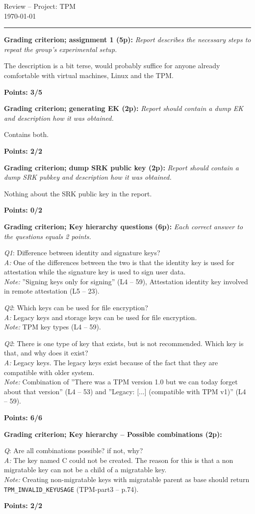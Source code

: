 \documentclass{article}
\newcommand{\grade}[5]{
  \textbf{Grading criterion; #1 (#3p):}\textit{#4}

  #5
  \hfill
  \begin{varwidth}{\linewidth}
    \textbf{Points: #2/#3}
  \end{varwidth}
}
\newcommand{\QAN}[5]{
  \textit{Q#1}:#3  \\
  \ifthenelse{\equal{#2}{C}}{
    \def \grading {\Large\textcolor{green}{\checkmark}\normalsize}
  }{
    \def \grading {\Large\textcolor{red}{\textbf{x}\hspace{0.142cm}}\normalsize}
  }
  \textit{A:}#4\hfill\grading \\
  \textit{Note:}#5
}
\begin{document}
  \begin{center}
    \huge{Review -- Project: TPM} \\
    \vspace{0.2cm}
    \Large{\today}
    \vspace{0.4cm}
    \hrule
  \end{center}

  \grade{assignment 1}{3}{5}
  {
    Report describes the necessary steps to repeat the group's
    experimental setup.
  }
  {
    The description is a bit terse, would probably suffice for anyone already
    comfortable with virtual machines, Linux and the TPM.
  }

  \grade{generating EK}{2}{2}
  {
    Report should contain a dump EK and description how it was obtained.
  }
  {
    Contains both.
  }

  \grade{dump SRK public key}{0}{2}
  {
    Report should contain a dump SRK pubkey and description how it was
    obtained.
  }
  {
    Nothing about the SRK public key in the report.
  }

  \grade{Key hierarchy questions}{6}{6}
  {
    Each correct answer to the questions equals 2 points.
  }
  {
    \QAN{1}{C}{
      Difference between identity and signature keys?
    }
    {
      One of the differences between the two is that the identity key is used
      for attestation while the signature key is used to sign user data.
    }
    {
      ''Signing keys only for signing'' (L4 -- 59), Attestation identity
      key involved in remote attestation (L5 -- 23).
    }

    \QAN{2}{C}{
      Which keys can be used for file encryption?
    }
    {
      Legacy keys and storage keys can be used for file encryption.
    }
    {
      TPM key types (L4 -- 59).
    }

    \QAN{2}{C}{
      There is one type of key that exists, but is not recommended. Which key
      is that, and why does it exist?
    }
    {
      Legacy keys. The legacy keys exist because of the fact that they are
      compatible with older system.
    }
    {
      Combination of ''There was a TPM version 1.0 but we can today forget
      about that version'' (L4 -- 53) and ''Legacy: [...] (compatible with TPM
      v1)'' (L4 -- 59).
    }
  }

  \grade{Key hierarchy -- Possible combinations}{2}{2}
  {}
  {
    \QAN{}{C}{
      Are all combinations possible? if not, why?
    }
    {
      The key named C could not be created. The reason for this is that a non
      migratable key can not be a child of a migratable key.
    }
    {
      Creating non-migratable keys with migratable parent as base should return
      \texttt{TPM\_INVALID\_KEYUSAGE} (TPM-part3 -- p.74).
    }
  }
\end{document}
